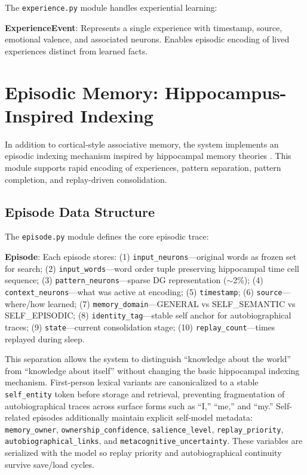 \documentclass[11pt]{article}
\begin{document}
The \texttt{experience.py} module handles experiential learning:

\textbf{ExperienceEvent}: Represents a single experience with timestamp, source, emotional valence, and associated neurons. Enables episodic encoding of lived experiences distinct from learned facts.

\section{Episodic Memory: Hippocampus-Inspired Indexing}

In addition to cortical-style associative memory, the system implements an
episodic indexing mechanism inspired by hippocampal memory theories \citep{teyler1986hippocampal,mcclelland1995there}.
This module supports rapid encoding of experiences, pattern separation, pattern completion,
and replay-driven consolidation.

\subsection{Episode Data Structure}

The \texttt{episode.py} module defines the core episodic trace:

\textbf{Episode}: Each episode stores: (1) \texttt{input\_neurons}---original words as frozen set for search; (2) \texttt{input\_words}---word order tuple preserving hippocampal time cell sequence; (3) \texttt{pattern\_neurons}---sparse DG representation ($\sim$2\%); (4) \texttt{context\_neurons}---what was active at encoding; (5) \texttt{timestamp}; (6) \texttt{source}---where/how learned; (7) \texttt{memory\_domain}---GENERAL vs SELF\_SEMANTIC vs SELF\_EPISODIC; (8) \texttt{identity\_tag}---stable self anchor for autobiographical traces; (9) \texttt{state}---current consolidation stage; (10) \texttt{replay\_count}---times replayed during sleep.

This separation allows the system to distinguish ``knowledge about the world'' from ``knowledge about itself'' without changing the basic hippocampal indexing mechanism. First-person lexical variants are canonicalized to a stable \texttt{self\_entity} token before storage and retrieval, preventing fragmentation of autobiographical traces across surface forms such as ``I,'' ``me,'' and ``my.''
Self-related episodes additionally maintain explicit self-model metadata: \texttt{memory\_owner}, \texttt{ownership\_confidence}, \texttt{salience\_level}, \texttt{replay\_priority}, \texttt{autobiographical\_links}, and \texttt{metacognitive\_uncertainty}. These variables are serialized with the model so replay priority and autobiographical continuity survive save/load cycles.
\end{document}

